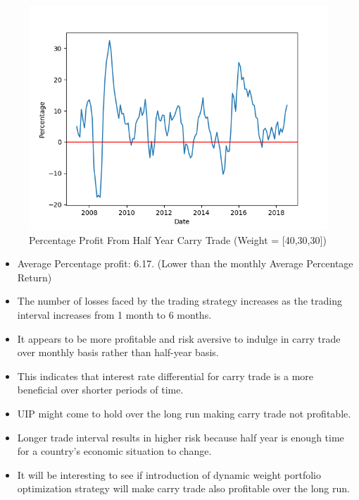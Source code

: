 \documentclass{article}
\begin{document}
\begin{figure}[H]
    \centering
    \includegraphics[scale=.75]{images/carryTrade/halfYear1.png}
    \caption{Percentage Profit From Half Year Carry Trade (Weight = [40,30,30])}
    \label{simulationfigure}
\end{figure}

\begin{itemize}
  \item Average Percentage profit: 6.17. (Lower than the monthly Average Percentage Return)
  \item The number of losses faced by the trading strategy increases as the trading interval increases from 1 month to 6 months.
  \item It appears to be more profitable and risk aversive to indulge in carry trade over monthly basis rather than half-year basis.
  \item This indicates that interest rate differential for carry trade is a more beneficial over shorter periods of time.
  \item UIP might come to hold over the long run making carry trade not profitable.
  \item Longer trade interval results in higher risk because half year is enough time for a country's economic situation to change.
  \item It will be interesting to see if introduction of dynamic weight portfolio optimization strategy will make carry trade also profitable over the long run.
\end{itemize}

\end{document}
